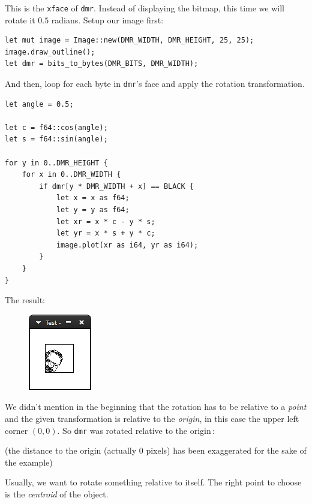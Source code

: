 \documentclass[12pt,a4,oneside,usenames,dvipsnames]{book}
\newcommand\bitmap{{\pixelfont{}bitmap}}
\newcommand\pixels{{\pixelfont{}pixels}}
\begin{document}
This is the \texttt{xface} of \texttt{dmr}. Instead of displaying the \bitmap{}, this time we will rotate it $0.5$ radians. Setup our image first:


\begin{verbatim}
let mut image = Image::new(DMR_WIDTH, DMR_HEIGHT, 25, 25);
image.draw_outline();
let dmr = bits_to_bytes(DMR_BITS, DMR_WIDTH);
\end{verbatim}

And then, loop for each byte in \texttt{dmr}'s face and apply the rotation transformation.

\begin{verbatim}
let angle = 0.5;

let c = f64::cos(angle);
let s = f64::sin(angle);

for y in 0..DMR_HEIGHT {
    for x in 0..DMR_WIDTH {
        if dmr[y * DMR_WIDTH + x] == BLACK {
            let x = x as f64;
            let y = y as f64;
            let xr = x * c - y * s;
            let yr = x * s + y * c;
            image.plot(xr as i64, yr as i64);
        }
    }
}
\end{verbatim}

The result:

\begin{figure}[H]
\centering
  \includegraphics{figures/ch11-2.png}
\end{figure}

We didn't mention in the beginning that the rotation has to be relative to a \emph{point} and the given transformation is relative to the \emph{origin}, in this case the upper left corner $(0,0)$. So \texttt{dmr} was rotated relative to the origin\,:
\begin{center}
  \def\svgscale{0.6}

  \def\svgscale{0.6}

\end{center}

{\centering{}\noindent(the distance to the origin (actually 0 \pixels{}) has been exaggerated for the sake of the example)}

Usually, we want to rotate something relative to itself. The right point to choose is the \emph{centroid} of the object.
\end{document}
